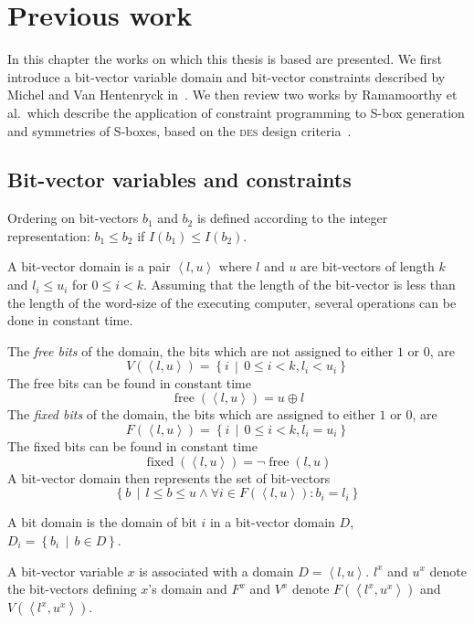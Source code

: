 \documentclass[a4paper,10pt,twoside,openright]{book}
\renewcommand{\sc}[1]{\textsc{\lowercase{#1}}}
\newcommand{\set}[1]{\left\{#1\right\}}
\newcommand{\suchthat}{\,\middle|\,}
\newcommand{\tuple}[1]{\left\langle #1\right\rangle}
\DeclareMathOperator{\fixed}{fixed}
\DeclareMathOperator{\free}{free}
\begin{document}
\chapter{Previous work}
\label{sec:previous}
In this chapter the works on which this thesis is based are presented. 
We first introduce a bit-vector variable domain 
and bit-vector constraints described by 
Michel and Van Hentenryck in~\cite{bitvectors}.
We then review 
two works by Ramamoorthy et al.\ which 
describe the application of constraint programming
to S-box generation
and symmetries of S-boxes,
based on the \sc{DES} design criteria~\cite{sboxes,sboxsymmetry}.

\section{Bit-vector variables and constraints}
\label{sec:bitvectors}

Ordering on bit-vectors $b_1$ and $b_2$ is defined according to the integer representation: $b_1 \leq b_2$ if $I(b_1) \leq I(b_2)$.

A bit-vector domain is a pair $\tuple{l,u}$ where $l$ and $u$ are bit-vectors of length $k$ and $l_i \leq u_i$ for $0 \leq i < k$. 
Assuming that the length of the bit-vector is less than the length of the word-size of the executing computer,
several operations can be done in constant time.

The \textit{free bits} of the domain, the bits which are not assigned to either $1$ or $0$, are \[V(\tuple{l,u}) = \set{i \suchthat 0 \leq i < k, l_i < u_i}\]
The free bits can be found in constant time \[\free(\tuple{l,u}) = u \oplus l\]
The \textit{fixed bits} of the domain, the bits which are assigned to either $1$ or $0$, are \[F(\tuple{l,u}) = \set{i \suchthat 0 \leq i < k, l_i = u_i}\]
The fixed bits can be found in constant time \[\fixed(\tuple{l,u}) = \lnot\free(l,u)\]
A bit-vector domain then represents the set of bit-vectors 
\[\set{b \suchthat l \leq b \leq u \land \forall i \in F(\tuple{l,u}) : b_i = l_i }\]

A bit domain is the domain of bit $i$ in a bit-vector domain $D$, $D_i = \set{b_i \suchthat b \in D}$.

A bit-vector variable $x$ is associated with a domain $D = \tuple{l,u}$. $l^x$ and $u^x$ denote the bit-vectors defining $x$'s domain and $F^x$ and $V^x$ denote $F(\tuple{l^x,u^x})$ and $V(\tuple{l^x,u^x})$. 
\end{document}
